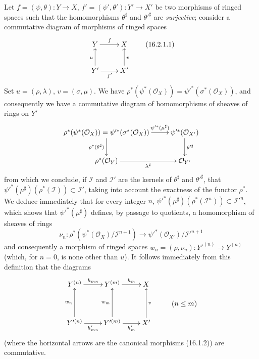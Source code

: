 \begin{env}[16.2.1]
\label{IV.16.2.1}
Let $f=(\psi,\theta):Y\to X$,
$f'=(\psi',\theta'):Y'\to X'$ be two morphisms of ringed spaces such that the
homomorphisms $\theta^\sharp$ and $\theta'^\sharp$ are \emph{surjective}; consider a
commutative diagram of morphisms of ringed spaces
\[
  \xymatrix{
    Y \ar[r]^f & X \\
    Y' \ar[r]_{f'} \ar[u]^u & X' \ar[u]_v
  }
  \tag{16.2.1.1}
  \label{IV.16.2.1.1}
\]
Set $u=(\rho,\lambda)$, $v=(\sigma,\mu)$. We have
$\rho^*(\psi^*(\mathcal{O}_X))=
\psi'^*(\sigma^*(\mathcal{O}_X))$, and consequently we have a commutative diagram
of homomorphisms of sheaves of rings on $Y'$
\[
  \xymatrix{
    \rho^*(\psi^*(\mathcal{O}_X))
      =\psi'^*(\sigma^*(\mathcal{O}_X))
      \ar[r]^-{\psi'^*(\mu^\sharp)}
      \ar[d]_{\rho^*(\theta^\sharp)}
      & \psi'^*(\mathcal{O}_{X'}) \ar[d]^{\theta'^\sharp} \\
    \rho^*(\mathcal{O}_Y) \ar[r]_-{\lambda^\sharp}
      & \mathcal{O}_{Y'}
  }
\]
from which we conclude, if $\mathscr{I}$ and $\mathscr{I}'$ are the kernels of
$\theta^\sharp$ and $\theta'^\sharp$, that
$\psi'^*(\mu^\sharp)(\rho^*(\mathscr{I}))\subset\mathscr{I}'$, taking into account
the exactness of the functor $\rho^*$. We deduce immediately that for every integer
$n$,
$\psi'^*(\mu^\sharp)(\rho^*(\mathscr{I}^n))\subset\mathscr{I}'^n$, which shows
that $\psi'^*(\mu^\sharp)$ defines, by passage to quotients, a homomorphism of
sheaves of rings
\[
  \nu_n:
  \rho^*(\psi^*(\mathcal{O}_X)/\mathscr{I}^{n+1})
  \longrightarrow
  \psi'^*(\mathcal{O}_{X'})/\mathscr{I}'^{n+1}
  \tag{16.2.1.2}
  \label{IV.16.2.1.2}
\]
and consequently a morphism of ringed spaces
$w_n=(\rho,\nu_n):Y'^{(n)}\to Y^{(n)}$ (which, for $n=0$, is none other than
$u$). It follows immediately from this definition that the diagrams
\[
  \xymatrix@R=1pc{
    Y^{(n)} \ar[r]^-{h_{mn}} & Y^{(m)} \ar[r]^-{h_m} & X \\
    & & & (n\leq m) \\
    Y'^{(n)} \ar[r]_-{h'_{mn}} \ar[uu]^-{w_n}
      & Y'^{(m)} \ar[r]_-{h'_m} \ar[uu]^-{w_m}
      & X' \ar[uu]_-v
  }
\]
(where the horizontal arrows are the canonical morphisms (16.1.2)) are
commutative.


\end{env}
